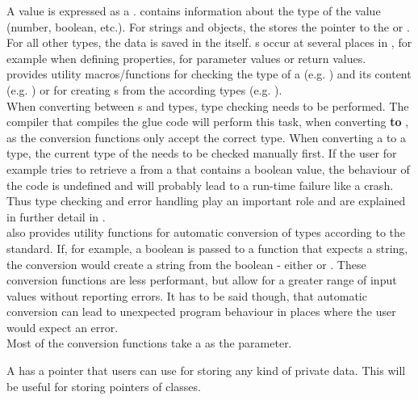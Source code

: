 A  value is expressed as a .  contains information about the type of the value (number, boolean, etc.). For strings and objects, the  stores the pointer to the  or . For all other types, the data is saved in the  itself. s occur at several places in , for example when defining properties, for parameter values or return values.\\
 provides utility macros/functions for checking the type of a  \linebreak(e.g. ) and its content (e.g. ) or for creating s from the according   types (e.g. ).\\
When converting between s and  types, type checking needs to be performed. The  compiler that compiles the glue code will perform this task, when converting \textbf{to} , as the conversion functions only accept the correct type. When converting a  to a  type, the current type of the  needs to be checked manually first. If the  user for example tries to retrieve a  from a  that contains a boolean value, the behaviour of the code is undefined and will probably lead to a run-time failure like a crash. Thus type checking and error handling play an important role and are explained in further detail in .\\
 also provides utility functions for automatic conversion of types according to the  standard. If, for example, a boolean is passed to a function that expects a string, the conversion would create a string from the boolean - either  or . These conversion functions are less performant, but allow for a greater range of input values without reporting errors. It has to be said though, that automatic conversion can lead to unexpected program behaviour in places where the user would expect an error.\\
Most of the conversion functions take a  as the parameter.

A  has a  pointer that  users can use for storing any kind of private data. This will be useful for storing pointers of  classes.

